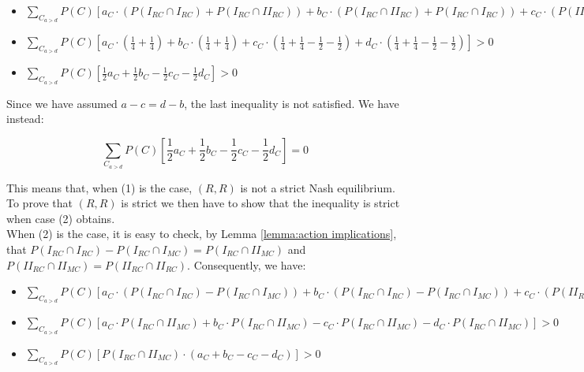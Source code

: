 \documentclass[fleqn,reqno,11pt]{article}
\begin{document}
\begin{itemize}

\item $\sum_{C_{a>d}} P(C)[a_{C} \cdot (P(I_{RC}\cap I_{RC}) + P(I_{RC}\cap II_{RC})) + b_{C} \cdot  (P(I_{RC}\cap II_{RC}) + P(I_{RC}\cap I_{RC})) + c_{C} \cdot (P(II_{RC}\cap I_{RC}) +P(II_{RC}\cap II_{RC})- P(I_{RC}\cap II_{MC})- P(II_{RC}\cap II_{MC})) + d_{C} \cdot (P(II_{RC}\cap II_{RC})+P(II_{RC}\cap I_{RC})- P(II_{RC}\cap II_{MC})- P(I_{RC}\cap II_{MC}))]> 0$

\item $\sum_{C_{a>d}} P(C)[a_{C} \cdot (\frac{1}{4}+\frac{1}{4}) + b_{C} \cdot  (\frac{1}{4}+\frac{1}{4}) + c_{C} \cdot (\frac{1}{4}+\frac{1}{4}-\frac{1}{2}-\frac{1}{2}) + d_{C} \cdot (\frac{1}{4}+\frac{1}{4}-\frac{1}{2}-\frac{1}{2})]> 0$

\item $\sum_{C_{a>d}} P(C)[\frac{1}{2}a_{C}+ \frac{1}{2}b_{C} - \frac{1}{2}c_{C} - \frac{1}{2}d_{C}]> 0$

\end{itemize}

\noindent Since we have assumed $ a-c = d-b $, the last inequality is not satisfied. We have instead: 

$$ \sum_{C_{a>d}} P(C)[\frac{1}{2}a_{C}+ \frac{1}{2}b_{C} - \frac{1}{2}c_{C} - \frac{1}{2}d_{C}]= 0 $$

\noindent This means that, when (1) is the case, $(R,R)$ is not a strict Nash equilibrium. To prove that $(R,R)$ is strict we then have to show that the inequality is strict when case (2) obtains. \\
When (2) is the case, it is easy to check, by Lemma \ref{lemma:action implications}, that $P(I_{RC} \cap I_{RC})-P(I_{RC}\cap I_{MC})=P(I_{RC}\cap II_{MC})$
and $P(II_{RC}\cap II_{MC})=P(II_{RC} \cap II_{RC})$.
Consequently, we have:

\begin{itemize}

\item $\sum_{C_{a>d}} P(C)[a_{C} \cdot (P(I_{RC}\cap I_{RC}) - P(I_{RC}\cap I_{MC})) + b_{C} \cdot  (P(I_{RC}\cap I_{RC})- P(I_{RC}\cap I_{MC})) + c_{C} \cdot (P(II_{RC}\cap II_{RC})- P(I_{RC}\cap II_{MC})- P(II_{RC}\cap II_{MC})) + d_{C} \cdot (P(II_{RC}\cap II_{RC})- P(II_{RC}\cap II_{MC})- P(I_{RC}\cap II_{MC}))]> 0$

\item $\sum_{C_{a>d}} P(C)[a_{C} \cdot P(I_{RC}\cap II_{MC}) + b_{C} \cdot  P(I_{RC}\cap II_{MC}) - c_{C} \cdot P(I_{RC}\cap II_{MC}) - d_{C} \cdot P(I_{RC}\cap II_{MC})]> 0$

\item $\sum_{C_{a>d}} P(C)[P(I_{RC}\cap II_{MC})\cdot (a_{C} + b_{C} - c_{C} - d_{C})]> 0$

\end{itemize}
\medskip{}
\end{document}
